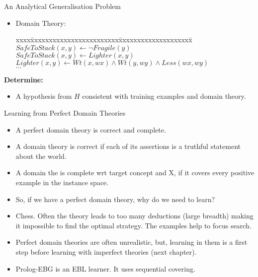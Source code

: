 \documentclass[%
pdf,
colorBG,
slideColor,
tcrico,
]{prosper}
\begin{document}

\begin{slide}{An Analytical Generalisation Problem}
\tiny	
\begin{itemize}
 \item 
	Domain Theory:
	\begin{tabbing}
	xxxx\=xxxxxxxxxxxxxxxxxxxxxxxx\=xxxxxxxxxxxxxxxxxxxx\= \kill 
		\>\hskip-16pt$ SafeToStack(x,y) \gets \neg Fragile(y)$ \\
		\>\hskip-16pt$SafeToStack(x,y) \gets Lighter(x,y)$ \\
		\>\hskip-16pt$Lighter(x,y) \gets Wt(x,wx)\wedge Wt(y,wy)\wedge Less(wx,wy)$ \\
		\>\hskip-16pt$\ldots$ \\
	\end{tabbing}
	\end{itemize}
	\vspace{-.1in}
	{\bf Determine:}
	\begin{itemize}
	\item A hypothesis from $H$ consistent with training examples and domain theory.
	\end{itemize}
\end{slide}




\begin{slide}{Learning from Perfect Domain Theories}
\tiny
	\begin{itemize}
 	\item A perfect domain theory is correct and complete.
    \item A domain theory is correct if each of its assertions is a truthful statement about the world.
    \item A domain the is complete wrt target concept and X, if it covers every positive example in the instance space.
    \item So, if we have a perfect domain theory, why do we need to learn?
    \item Chess. Often the theory leads to too many deductions (large breadth) making it impossible to find the optimal strategy. The examples help to focus search.
    \item Perfect domain theories are often unrealistic, but, learning in them is a first step before learning with imperfect theories (next chapter).
    \item Prolog-EBG is an EBL learner. It uses sequential covering.
\end{itemize}

\end{slide}
\end{document}
